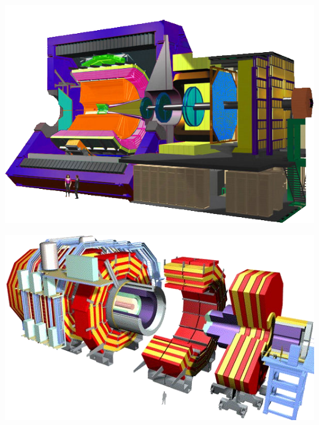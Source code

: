 \marginpar
{
	\includegraphics[width=\marginparwidth]{LHC/alice.png}
	\label{alice}
}

\marginpar
{
	\includegraphics[width=\marginparwidth]{LHC/cms.png}
	\label{cms}
}

